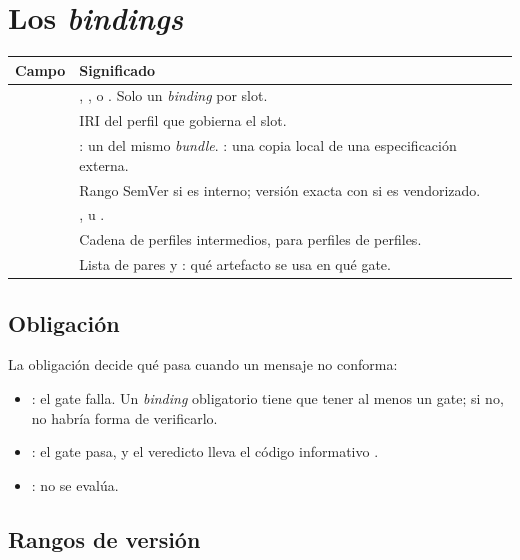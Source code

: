 \section{Los \emph{bindings}}

\noindent\begin{tabularx}{\linewidth}{@{}L{2.6cm}Y@{}}
\toprule
\textbf{Campo} & \textbf{Significado} \\
\midrule
{} & , ,  o . Solo un \emph{binding} por slot. \\
 & IRI del perfil que gobierna el slot. \\
 & : un  del mismo \emph{bundle}. : una copia local de una especificación externa. \\
 & Rango SemVer si es interno; versión exacta con \cod{=} si es vendorizado. \\
 & ,  u . \\
 & Cadena de perfiles intermedios, para perfiles de perfiles. \\
 & Lista de pares  y : qué artefacto se usa en qué gate. \\
\bottomrule
\end{tabularx}

\subsection{Obligación}

La obligación decide qué pasa cuando un mensaje no conforma:

\begin{itemize}[leftmargin=*, itemsep=2pt]
  \item {}: el gate falla. Un \emph{binding} obligatorio tiene que tener al menos un gate; si no,
        no habría forma de verificarlo.
  \item {}: el gate pasa, y el veredicto lleva el código informativo
        .
  \item {}: no se evalúa.
\end{itemize}

\subsection{Rangos de versión}

